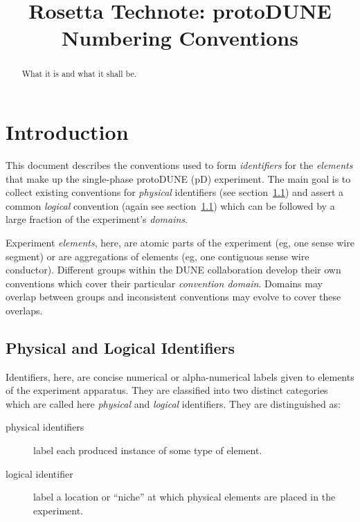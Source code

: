 \documentclass[letterpaper,twoside,onecolumn,report]{memoir}
\title{Rosetta Technote: protoDUNE Numbering Conventions}
\date{}
\begin{document}
\maketitle

\begin{abstract}
  What it is and what it shall be.
\end{abstract}
\clearpage

\tableofcontents
\clearpage

\section{Introduction}

This document describes the conventions used to form
\textit{identifiers} for the \textit{elements} that make up the
single-phase protoDUNE (pD) experiment.  The main goal is to collect
existing conventions for \textit{physical} identifiers (see
section~\ref{sec:physlog}) and assert a common \textit{logical}
convention (again see section~\ref{sec:physlog}) which can be followed
by a large fraction of the experiment's \textit{domains}.

Experiment \textit{elements}, here, are atomic parts of the experiment
(eg, one sense wire segment) or are aggregations of elements (eg, one
contiguous sense wire conductor).  Different groups within the DUNE
collaboration develop their own conventions which cover their
particular \textit{convention domain}.  Domains may overlap between
groups and inconsistent conventions may evolve to cover these
overlaps.  

\subsection{Physical and Logical Identifiers}
\label{sec:physlog}

Identifiers, here, are concise numerical or alpha-numerical labels
given to elements of the experiment apparatus.  They are classified
into two distinct categories which are called here \textit{physical}
and \textit{logical} identifiers.  They are distinguished as:
\begin{description}
\item[physical identifiers] label each produced instance of some type
  of element.

\item[logical identifier] label a location or ``niche'' at which
  physical elements are placed in the experiment. 
\end{description}
\end{document}
